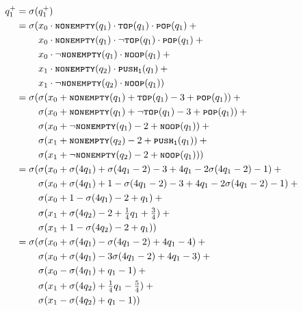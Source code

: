 \documentclass{beamer}
\newcommand{\pushone}{\texttt{\textsc{push}}\textsubscript{\texttt{1}}}
\newcommand{\nonempty}{\textsc{\texttt{nonempty}}}
\newcommand{\tos}{\textsc{\texttt{top}}}
\newcommand{\pop}{\textsc{\texttt{pop}}}
\newcommand{\noop}{\textsc{\texttt{noop}}}
\begin{document}
\begin{frame}
	\scriptsize
	\vspace{-1mm}
	\begin{align*}
		q_1^+=\sigma(&q_1^+)\\
		     =\sigma(&x_0\cdot\nonempty(q_1)\cdot\tos(q_1)\cdot\pop(q_1)\:+\\
		             &x_0\cdot\nonempty(q_1)\cdot\lnot\tos(q_1)\cdot\pop(q_1)\:+\\
		             &x_0\cdot\lnot\nonempty(q_1)\cdot\noop(q_1)\:+\\
		             &x_1\cdot\nonempty(q_2)\cdot\pushone(q_1)\:+\\
		             &x_1\cdot\lnot\nonempty(q_2)\cdot\noop(q_1))\\
		     =\sigma(&\sigma(x_0+\nonempty(q_1)+\tos(q_1)-3+\pop(q_1))\:+\\
		             &\sigma(x_0+\nonempty(q_1)+\lnot\tos(q_1)-3+\pop(q_1))\:+\\
		             &\sigma(x_0+\lnot\nonempty(q_1)-2+\noop(q_1))\:+\\
		             &\sigma(x_1+\nonempty(q_2)-2+\pushone(q_1))\:+\\
		             &\sigma(x_1+\lnot\nonempty(q_2)-2+\noop(q_1)))\\
		     =\sigma(&\sigma(x_0+\sigma(4q_1)+\sigma(4q_1-2)-3+4q_1-2\sigma(4q_1-2)-1)\:+\\
		             &\sigma(x_0+\sigma(4q_1)+1-\sigma(4q_1-2)-3+4q_1-2\sigma(4q_1-2)-1)\:+\\
		             &\sigma(x_0+1-\sigma(4q_1)-2+q_1)\:+ \\
		             &\sigma(x_1+\sigma(4q_2)-2+\textstyle{\frac{1}{4}}q_1+\textstyle{\frac{3}{4}})\:+\\
		             &\sigma(x_1+1-\sigma(4q_2)-2+q_1))\\
		     =\sigma(&\sigma(x_0+\sigma(4q_1)-\sigma(4q_1-2)+4q_1-4)\:+\\
		             &\sigma(x_0+\sigma(4q_1)-3\sigma(4q_1-2)+4q_1-3)\:+\\
		             &\sigma(x_0-\sigma(4q_1)+q_1-1)\:+\\
		             &\sigma(x_1+\sigma(4q_2)+\textstyle{\frac{1}{4}}q_1-\textstyle{\frac{5}{4}})\:+\\
		             &\sigma(x_1-\sigma(4q_2)+q_1-1))
	\end{align*}
\end{frame}
\end{document}
